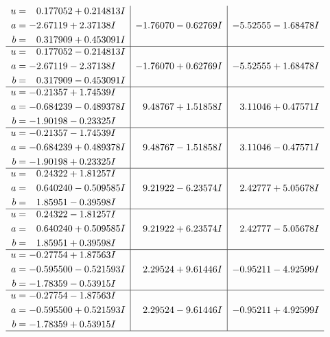 \documentclass[1p]{elsarticle_modified}
\theoremstyle{definition}
\begin{document}
$$\begin{array}{c|c|c}
\begin{aligned}
u &= \phantom{-}0.177052 + 0.214813 I \\
a &= -2.67119 + 2.37138 I \\
b &= \phantom{-}0.317909 + 0.453091 I\end{aligned}
 & -1.76070 - 0.62769 I & -5.52555 - 1.68478 I \\ \hline\begin{aligned}
u &= \phantom{-}0.177052 - 0.214813 I \\
a &= -2.67119 - 2.37138 I \\
b &= \phantom{-}0.317909 - 0.453091 I\end{aligned}
 & -1.76070 + 0.62769 I & -5.52555 + 1.68478 I \\ \hline\begin{aligned}
u &= -0.21357 + 1.74539 I \\
a &= -0.684239 - 0.489378 I \\
b &= -1.90198 - 0.23325 I\end{aligned}
 & \phantom{-}9.48767 + 1.51858 I & \phantom{-}3.11046 + 0.47571 I \\ \hline\begin{aligned}
u &= -0.21357 - 1.74539 I \\
a &= -0.684239 + 0.489378 I \\
b &= -1.90198 + 0.23325 I\end{aligned}
 & \phantom{-}9.48767 - 1.51858 I & \phantom{-}3.11046 - 0.47571 I \\ \hline\begin{aligned}
u &= \phantom{-}0.24322 + 1.81257 I \\
a &= \phantom{-}0.640240 - 0.509585 I \\
b &= \phantom{-}1.85951 - 0.39598 I\end{aligned}
 & \phantom{-}9.21922 - 6.23574 I & \phantom{-}2.42777 + 5.05678 I \\ \hline\begin{aligned}
u &= \phantom{-}0.24322 - 1.81257 I \\
a &= \phantom{-}0.640240 + 0.509585 I \\
b &= \phantom{-}1.85951 + 0.39598 I\end{aligned}
 & \phantom{-}9.21922 + 6.23574 I & \phantom{-}2.42777 - 5.05678 I \\ \hline\begin{aligned}
u &= -0.27754 + 1.87563 I \\
a &= -0.595500 - 0.521593 I \\
b &= -1.78359 - 0.53915 I\end{aligned}
 & \phantom{-}2.29524 + 9.61446 I & -0.95211 - 4.92599 I \\ \hline\begin{aligned}
u &= -0.27754 - 1.87563 I \\
a &= -0.595500 + 0.521593 I \\
b &= -1.78359 + 0.53915 I\end{aligned}
 & \phantom{-}2.29524 - 9.61446 I & -0.95211 + 4.92599 I\\
 \hline 
 \end{array}$$\newpage\newpage\renewcommand{\arraystretch}{1}
\end{document}
